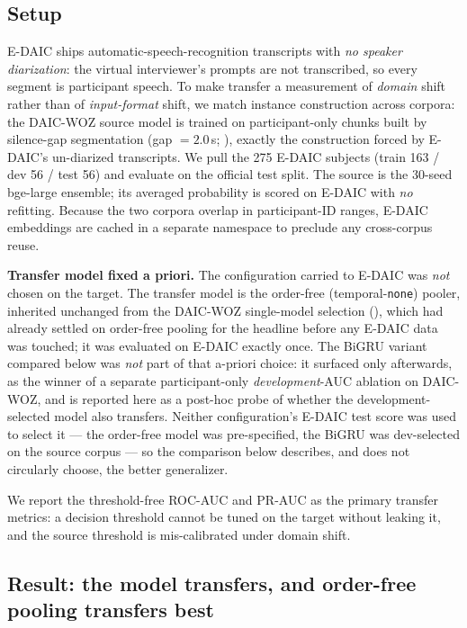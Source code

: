 \documentclass[conference]{IEEEtran}
\begin{document}
\subsection{Setup}
\label{sec:edaic-setup}
E-DAIC ships automatic-speech-recognition transcripts with \emph{no speaker
diarization}: the virtual interviewer's prompts are not transcribed, so every
segment is participant speech. To make transfer a measurement of \emph{domain}
shift rather than of \emph{input-format} shift, we match instance construction
across corpora: the DAIC-WOZ source model is trained on participant-only chunks
built by silence-gap segmentation (gap $=2.0$\,s; ), exactly the
construction forced by E-DAIC's un-diarized transcripts. We pull the 275 E-DAIC
subjects (train 163 / dev 56 / test 56) and evaluate on the official test split.
The source is the 30-seed bge-large ensemble; its averaged probability is scored
on E-DAIC with \emph{no} refitting. Because the two corpora overlap in
participant-ID ranges, E-DAIC embeddings are cached in a separate namespace to
preclude any cross-corpus reuse.

\textbf{Transfer model fixed a priori.} The configuration carried to E-DAIC was
\emph{not} chosen on the target. The transfer model is the order-free
(temporal-\texttt{none}) pooler, inherited unchanged from the DAIC-WOZ
single-model selection (), which had already settled on
order-free pooling for the headline before any E-DAIC data was touched; it was
evaluated on E-DAIC exactly once. The BiGRU variant compared below was
\emph{not} part of that a-priori choice: it surfaced only afterwards, as the
winner of a separate participant-only \emph{development}-AUC ablation on
DAIC-WOZ, and is reported here as a post-hoc probe of whether the
development-selected model also transfers. Neither configuration's E-DAIC test score was used to
select it --- the order-free model was pre-specified, the BiGRU was dev-selected
on the source corpus --- so the comparison below describes, and does not
circularly choose, the better generalizer.

We report the threshold-free ROC-AUC and PR-AUC as the primary transfer metrics: a decision threshold cannot be tuned on the target without
leaking it, and the source threshold is mis-calibrated under domain shift.

\subsection{Result: the model transfers, and order-free pooling transfers best}
\label{sec:edaic-result}
\end{document}
